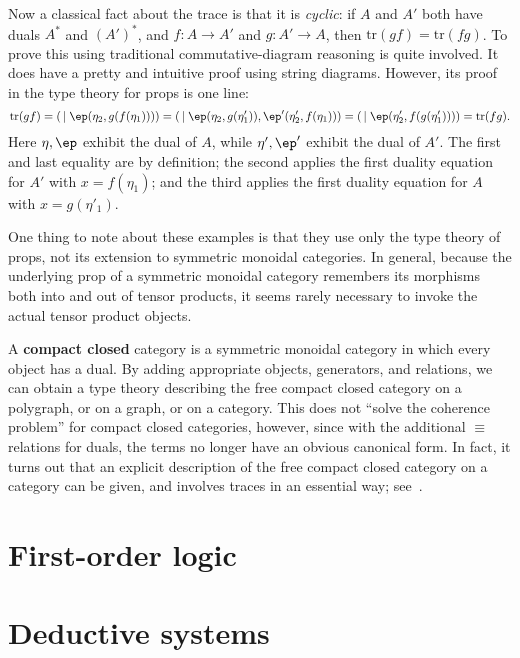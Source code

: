 \documentclass{book}
\def\tr{\mathrm{tr}}
\begin{document}
Now a classical fact about the trace is that it is \emph{cyclic}: if $A$ and $A'$ both have duals $A^*$ and $(A')^*$, and $f:A\to A'$ and $g:A'\to A$, then $\tr(gf) = \tr(fg)$.
To prove this using traditional commutative-diagram reasoning is quite involved.
It does have a pretty and intuitive proof using string diagrams.
However, its proof in the type theory for props is one line:
\[ \tr(gf) = (\,\mid \ep(\eta_2,g(f(\eta_1))))
= (\,\mid \ep(\eta_2,g(\eta'_1)),\ep'(\eta'_2,f(\eta_1)))
= (\,\mid \ep(\eta'_2,f(g(\eta'_1))))
= \tr(fg).
\]
Here $\eta,\ep$ exhibit the dual of $A$, while $\eta',\ep'$ exhibit the dual of $A'$.
The first and last equality are by definition;
the second applies the first duality equation for $A'$ with $x=f(\eta_1)$; and the third applies the first duality equation for $A$ with $x=g(\eta'_1)$.

One thing to note about these examples is that they use only the type theory of props, not its extension to symmetric monoidal categories.
In general, because the underlying prop of a symmetric monoidal category remembers its morphisms both into and out of tensor products, it seems rarely necessary to invoke the actual tensor product objects.

\begin{rmk}
  A \textbf{compact closed} category is a symmetric monoidal category in which every object has a dual.
  By adding appropriate objects, generators, and relations, we can obtain a type theory describing the free compact closed category on a polygraph, or on a graph, or on a category.
  This does not ``solve the coherence problem'' for compact closed categories, however, since with the additional $\equiv$ relations for duals, the terms no longer have an obvious canonical form.
  In fact, it turns out that an explicit description of the free compact closed category on a category can be given, and involves traces in an essential way; see~\cite{kl:cpt}.
\end{rmk}


\chapter{First-order logic}
\label{chap:fol}


\appendix

\chapter{Deductive systems}
\label{chap:dedsys}
\end{document}
